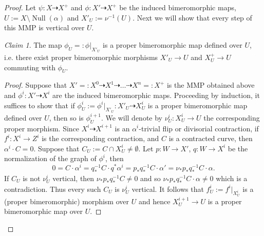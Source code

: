 \documentclass[12pt]{amsart}
\theoremstyle{plain}
\theoremstyle{remark}
\theoremstyle{definition}
\def\Null{\operatorname{Null}}
\newcommand{\<}{\leq}
\theoremstyle{definition}
\theoremstyle{definition}
\numberwithin{equation}{section}
\theoremstyle{remark}
\newtheorem{claim}[theorem]{Claim}
\begin{document}
\begin{proof}
Let $\psi:X\dasharrow X^+$ and $\phi:X'\dasharrow X^+$ be the induced bimeromorphic maps,  $U:=X\setminus\Null(\alpha)$ and $X'_{U}:=\nu^{-1}(U)$. Next we will show that every step of this MMP is vertical over $U$.




\begin{claim}\label{c-p}
The map $\phi _U=:\phi |_{X'_U}$ is a proper bimeromorphic map defined over $U$, i.e. there exist proper bimeromorphic morphisms $X'_U\to U$ and $X^+_U\to U$ commuting with $\phi_U$.
\end{claim} 
\begin{proof}
  
Suppose that $X'=:X^0\dasharrow X^1\dasharrow \ldots \dasharrow X^n=:X^+$ is the MMP obtained above and $\phi ^i:X'\dasharrow X^i$ are the induced bimeromorphic maps. Proceeding by induction, it suffices to show that if
$\phi ^i_U:=\phi ^i|_{X'_U}:X'_U\dasharrow X^i_U$ is a proper bimeromorphic map defined over $U$, then so is $\phi ^{i+1}_U$. We will denote by $\nu ^i_U:X^i_U\to U$ the corresponding proper morphism.
Since $X^i\dasharrow X^{i+1}$ is an $\alpha ^i$-trivial flip or divisorial contraction,  if $f^i: X^i\to Z^i$ is the corresponding contraction, and $C$ is a contracted curve, then $\alpha ^i\cdot C=0$. Suppose that $C_U:=C\cap X^i_U\ne \emptyset$. 
Let $p:W\to X'$, $q:W\to X^i$ be the normalization of the graph of $\phi ^i$, then \[0=C\cdot \alpha ^i=q^{-1}_*C\cdot q^* \alpha ^i=p_*q^{-1}_*C\cdot  \alpha '=\nu _* p_*q^{-1}_*C\cdot \alpha .\] If $C_U$ is not $\nu ^i_U$ vertical, then $\nu _* p_*q^{-1}_*C\ne 0$ and so $\nu _* p_*q^{-1}_*C\cdot \alpha \ne 0$ which is a contradiction. Thus every such $C_U$  is $\nu ^i_U$ vertical.  It follows that $f^i_U:=f^i|_{X^i_U}$ is a (proper bimeromorphic) morphism over $U$ and hence $X^{i+1}_U\to U$ is a proper bimeromorphic map over $U$. 
  
\end{proof}


\end{proof}
\end{document}
